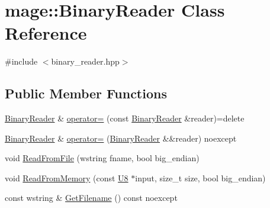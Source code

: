 \hypertarget{classmage_1_1_binary_reader}{}\section{mage\+:\+:Binary\+Reader Class Reference}
\label{classmage_1_1_binary_reader}


{\ttfamily \#include $<$binary\+\_\+reader.\+hpp$>$}

\subsection*{Public Member Functions}
\begin{DoxyCompactItemize}
\item 
\hyperlink{classmage_1_1_binary_reader}{Binary\+Reader} \& \hyperlink{classmage_1_1_binary_reader_a0408bb456983b4a03ae42ab69c6f4bc3}{operator=} (const \hyperlink{classmage_1_1_binary_reader}{Binary\+Reader} \&reader)=delete
\item 
\hyperlink{classmage_1_1_binary_reader}{Binary\+Reader} \& \hyperlink{classmage_1_1_binary_reader_a280998bb89dacdcb88ec87c49ce90a02}{operator=} (\hyperlink{classmage_1_1_binary_reader}{Binary\+Reader} \&\&reader) noexcept
\item 
void \hyperlink{classmage_1_1_binary_reader_ad302abb7498cce11c0982d98973817de}{Read\+From\+File} (wstring fname, bool big\+\_\+endian)
\item 
void \hyperlink{classmage_1_1_binary_reader_afac22c8586ceee77895121e904de1845}{Read\+From\+Memory} (const \hyperlink{namespacemage_afc638980bc6154f15af5e2d93a0e0ea9}{U8} $\ast$input, size\+\_\+t size, bool big\+\_\+endian)
\item 
const wstring \& \hyperlink{classmage_1_1_binary_reader_ad9d4a4a3e2f0afc666d15badff08fe4a}{Get\+Filename} () const noexcept
\end{DoxyCompactItemize}
